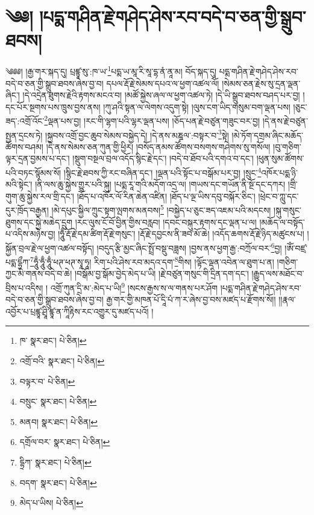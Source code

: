 \setcounter{footnote}{0} 
\chapter{༄༅། །པདྨ་གཤིན་རྗེ་གཤེད་ཤེས་རབ་བདེ་བ་ཅན་གྱི་སྒྲུབ་ཐབས།}༄༅༅། །རྒྱ་གར་སྐད་དུ། པྲཛྙཱ་སུ་:ཁ་ཡ་\footnote{ཁ་  སྣར་ཐང་།  པེ་ཅིན། }པདྨ་ཡ་མཱ་རི་སཱ་དྷ་ནཾ་ནཱ་མ། བོད་སྐད་དུ། པདྨ་གཤིན་རྗེ་གཤེད་ཤེས་རབ་བདེ་བ་ཅན་གྱི་སྒྲུབ་ཐབས་ཞེས་བྱ་བ། དཔལ་རྡོ་རྗེ་སེམས་དཔའ་ལ་ཕྱག་འཚལ་ལོ། །སེམས་ཅན་རྗེས་སུ་དྲན་ལྡན་ཞིང་། །དེ་འདྲེན་ཐུགས་རྗེའི་རྟགས་མངའ་བ། །མཚོ་སྐྱེས་ཞལ་ལ་ཕྱག་འཚལ་ཏེ། །དེ་ཡི་སྒྲུབ་ཐབས་བཤད་པར་བྱ། །དང་པོར་སྔགས་པས་ཁྲུས་བྱས་ནས། །ཀུ་ཤའི་སྟན་ལ་ལེགས་འདུག་སྟེ། །ལུས་ངག་ཡིད་གསུམ་བག་ལྡན་པས། །ཅུང་ཟད་:འགྲོ་འོང་\footnote{འགྲོ་བའི་  སྣར་ཐང་།  པེ་ཅིན། }ལྡན་པས་བྱ། །རང་གི་ལྷག་པའི་ལྷར་ལྡན་པས། །ཅོད་པན་རྗེ་བཙུན་གཟུང་བར་བྱ། །དེ་ནས་རྗེ་བཙུན་སྤྱན་དྲངས་ཏེ། །སྐྱབས་འགྲོ་བྱང་ཆུབ་སེམས་བསྐྱེད་དེ། །དེ་ནས་མཎྜལ་:བསྟར་བ་\footnote{བལྟར་བ་  པེ་ཅིན། }སྟེ། །མེ་ཏོག་དགྲམ་ཞིང་མཆོད་ཚོགས་བཤམ། །དེ་ནས་སེམས་ཅན་ཀུན་གྱི་ཕྱིར། །བསོད་ནམས་ཚོགས་བསགས་གཤེགས་སུ་གསོལ། །བུ་གཅིག་ལྟར་དྲན་བྱམས་པ་དང་། །སྡུག་བསྔལ་བྲལ་འདོད་སྙིང་རྗེ་དང་། །བདེ་བ་ཐོབ་པའི་དགའ་བ་དང་། །ཕུན་སུམ་ཚོགས་པའི་བཏང་སྙོམས་སོ། །སྙིང་རྗེ་ཐབས་ཀྱི་རང་བཞིན་དང་། །ལྡན་པའི་སྟོང་པ་བསྒོམ་པར་བྱ། །སྲུང་\footnote{བསྲུང་  སྣར་ཐང་།  པེ་ཅིན། }འཁོར་པདྨ་ཉི་མའི་སྟེང་། །ནི་ལས་ཆུ་སྐྱེས་གྱུར་པའི་སྐུ། །པདྨ་རཱ་གའི་མདོག་འདྲ་ལ། །གཡས་དང་གཡོན་ནི་སྔོ་དང་དཀར། །གྲི་གུག་ཆུ་སྐྱེས་རལ་གྲི་དང་། །ཐོད་པ་འཁོར་ལོ་རིན་ཆེན་འཛིན། །ཐོད་པ་ལྔ་ཡིས་དབུ་བསྐོར་ཅིང་། །ཕྲེང་བ་ཀླུ་དང་དུར་ཁྲོད་བརྒྱན། །མེ་དཔུང་སྐྱིལ་ཀྲུང་སྟག་ལྤགས་མནབས།\footnote{མནབ།  སྣར་ཐང་།  པེ་ཅིན། } །བསྐྱེད་པ་ཅུང་ཟད་འཇམ་པའི་མདངས། །སྐུ་གསུང་ཐུགས་དང་སྐྱེ་མཆེད་དྲུག །རང་ལུས་ངོ་བོ་བྱིན་གྱིས་བརླབ། །དབང་བསྐུར་རྟགས་དང་ལྡན་པ་ལ། །མཆོད་ལ་བསྟོད་པ་འདིས་མཉེས་བྱ། །ཧཱུྃ་རྡོ་རྗེ་དམ་ཚིག་རྡོ་རྗེ་གསུང་། །རྡོ་རྗེ་དབྱངས་ནི་ཟབ་མོ་ཆེ། །འདོད་ཆགས་རྡོ་རྗེ་ཉིད་མཚུངས་པ། །སྐྱོན་བྲལ་རྗེ་ལ་ཕྱག་འཚལ་བསྟོད། །བདུད་རྩི་མྱང་ཞིང་སྤྲོ་བསྡུ་བཟླས། །བྱས་ནས་ཕྱག་རྒྱ་:བཀྲོལ་བར་\footnote{དགྲོལ་བར་  སྣར་ཐང་།  པེ་ཅིན། }བྱ། །ཨོཾ་བཛྲ་པདྨ་དྷྲྀཀ་\footnote{དྷྲིཀ་  སྣར་ཐང་།  པེ་ཅིན། }ཧཱུྃ་ཧཱུྃ་ཧཱུྃ་ཕཊ་ཕཊ་སྭཱ་ཧཱ། རིག་པའི་ཤེས་རབ་མདའ་དག་\footnote{བདག་  སྣར་ཐང་།  པེ་ཅིན། }གིས། །ལྟོང་ལྡན་འབེན་ལ་ཐུག་པ་ན། །གཅིག་ཀྱང་མི་གནས་བདེ་བ་ཆེ། །བསྒོམ་བྱ་སྒོམ་བྱེད་མེད་པ་ཡི། །རྗེ་བཙུན་གསུང་གི་དྲིན་དག་དང་། །རྒྱུད་ལས་མཐོང་བ་བྲིས་པ་འདིས། །
འགྲོ་ཀུན་དྲི་མ་:མེད་པ་ཡི།\footnote{མེད་པ་ཡིས།  པེ་ཅིན། } །སངས་རྒྱས་ས་ལ་གནས་པར་ཤོག །པདྨ་གཤིན་རྗེ་གཤེད་ཤེས་རབ་བདེ་བ་ཅན་གྱི་སྒྲུབ་ཐབས་ཞེས་བྱ་བ། རྒྱ་གར་གྱི་མཁན་པོ་དཱི་པཾ་ཀ་ར་ཞེས་བྱ་བས་མཛད་པ་རྫོགས་སོ།། །།རྣལ་འབྱོར་པ་པྲཛྙཱ་ཤྲཱི་ཛྙཱ་ན་ཀཱིརྟིས་རང་འགྱུར་དུ་མཛད་པའོ། ། 